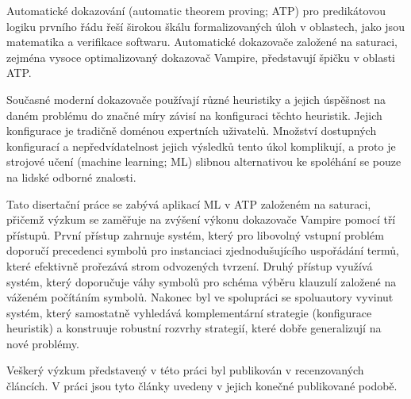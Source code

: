 Automatické dokazování (automatic theorem proving; ATP) pro predikátovou logiku prvního řádu řeší širokou škálu formalizovaných úloh v oblastech, jako jsou matematika a verifikace softwaru. Automatické dokazovače založené na saturaci, zejména vysoce optimalizovaný dokazovač Vampire, představují špičku v oblasti ATP.

Současné moderní dokazovače používají různé heuristiky a jejich úspěšnost na daném problému do značné míry závisí na konfiguraci těchto heuristik. Jejich konfigurace je tradičně doménou expertních uživatelů. Množství dostupných konfigurací a nepředvídatelnost jejich výsledků tento úkol komplikují, a proto je strojové učení (machine learning; ML) slibnou alternativou ke spoléhání se pouze na lidské odborné znalosti.

Tato disertační práce se zabývá aplikací ML v ATP založeném na saturaci, přičemž výzkum se zaměřuje na zvýšení výkonu dokazovače Vampire pomocí tří přístupů. První přístup zahrnuje systém, který pro libovolný vstupní problém doporučí precedenci symbolů pro instanciaci zjednodušujícího uspořádání termů, které efektivně prořezává strom odvozených tvrzení. Druhý přístup využívá systém, který doporučuje váhy symbolů pro schéma výběru klauzulí založené na váženém počítáním symbolů. Nakonec byl ve spolupráci se spoluautory vyvinut systém, který samostatně vyhledává komplementární strategie (konfigurace heuristik) a konstruuje robustní rozvrhy strategií, které dobře generalizují na nové problémy.

Veškerý výzkum představený v této práci byl publikován v recenzovaných článcích. V práci jsou tyto články uvedeny v jejich konečné publikované podobě.
